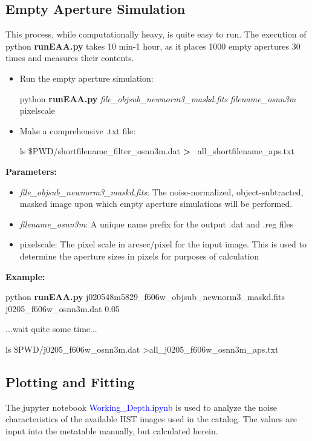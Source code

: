 \documentclass[a4paper,10pt]{article}
\begin{document}
\subsection{Empty Aperture Simulation}
This process, while computationally heavy, is quite easy to run. The execution of python \textbf{runEAA.py} takes 10 min-1 hour, as it places 1000 empty apertures 30 times and measures their contents.
\begin{itemize}
    \setlength{\itemsep}{-2pt}
 \item Run the empty aperture simulation:\\
 
 \centerline{python \textbf{runEAA.py} \textit{file\_objsub\_newnorm3\_maskd.fits} \textit{filename\_osnn3m} pixelscale} 
 
 \item Make a comprehensive .txt file:\\
 
 \centerline{ls \$PWD/shortfilename\_filter\_osnn3m\*.dat \textbf{\textgreater} \ all\_shortfilename\_aps.txt}
\end{itemize}

\noindent \textbf{Parameters:}
\begin{itemize}
 \item \textit{file\_objsub\_newnorm3\_maskd.fits}: The noise-normalized, object-subtracted, masked image upon which empty aperture simulations will be performed.
 \item \textit{filename\_osnn3m}: A unique name prefix for the output .dat and .reg files
 \item pixelscale: The pixel scale in arcsec/pixel for the input image. This is used to determine the aperture sizes in pixels for purposes of calculation
\end{itemize}


\noindent \textbf{Example:}

\centerline{python \textbf{runEAA.py} j020548m5829\_f606w\_objsub\_newnorm3\_maskd.fits j0205\_f606w\_osnn3m.dat 0.05}

\centerline{...wait quite some time...}

\centerline{ls \$PWD/j0205\_f606w\_osnn3m.dat \textgreater all\_j0205\_f606w\_osnn3m\_aps.txt}

\subsection{Plotting and Fitting}

The jupyter notebook \textcolor{blue}{Working\_Depth.ipynb} is used to analyze the noise characteristics of the available HST images used in the catalog. The values are input into the metatable manually, but calculated herein.
\end{document}
